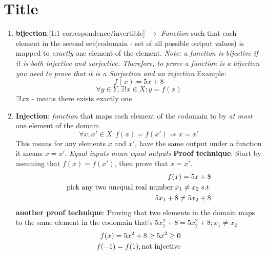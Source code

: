 \documentclass[11pt]{article}
\begin{document}

\section*{Title}
\begin{enumerate}
    \item \textbf{bijection}:[1:1 correspondence/invertible] $\rightarrow$ \textit{Function} such that each element in the second set(codomain - set of all possible output values) is mapped to \textit{exactly} one element of the element. \textit{Note: a function is bijective if it is both injective and surjective. Therefore, to prove a function is a bijection you need to prove that it is a Surjection and an injection}
     Example:
    \begin{equation}
        f(x) = 5x+8
    \end{equation}
    \begin{equation}
        \forall y \in Y, \exists !x \in X: y = f(x)
    \end{equation}
    $\exists !x$z - means there exists exactly one

    \item \textbf{Injection}: \textit{function} that maps each element of the codomain to by \textit{at most} one element of the domain
    \begin{equation}
        \forall x, x' \in X: f(x) = f(x') \Rightarrow x = x'
    \end{equation}
    This means for any elements $x$ and $x'$, have the same output under a function it means $x=x'$. \textit{Equal inputs mean equal outputs}
    \textbf{Proof technique}: Start by assuming that $f(x)=f(x')$, then prove that $x=x'$.
    \begin{equation}
        \begin{aligned}
            f(x) = 5x + 8 \\
            \textnormal{pick any two unequal real number} \hspace{1.0mm} x_{1} \not = x_{2} \hspace{1.0mm} s.t. \\
            5x_{1} + 8 \not = 5x_{2} + 8
        \end{aligned}
    \end{equation}
    \textbf{another proof technique}: Proving that two elements in the domain maps to the same element in the codomain that's $5x_{1}^2 + 8 = 5x_{2}^2+8; x_{1} \not = x_{2}$ \\
    \begin{equation}
        \begin{aligned}
            f(x) = 5x^2 + 8 \geq 5x^2 \geq 0 \\
            f(-1) = f(1); \textnormal{not injective}
        \end{aligned}
    \end{equation}


\end{enumerate}
\end{document}
